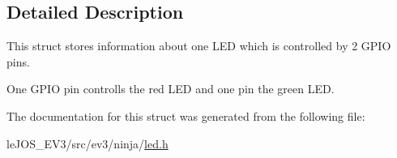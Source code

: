 \subsection{Detailed Description}
This struct stores information about one L\+E\+D which is controlled by 2 G\+P\+I\+O pins. 

One G\+P\+I\+O pin controlls the red L\+E\+D and one pin the green L\+E\+D. 

The documentation for this struct was generated from the following file\+:\begin{DoxyCompactItemize}
\item 
le\+J\+O\+S\+\_\+\+E\+V3/src/ev3/ninja/\hyperlink{led_8h}{led.\+h}\end{DoxyCompactItemize}
